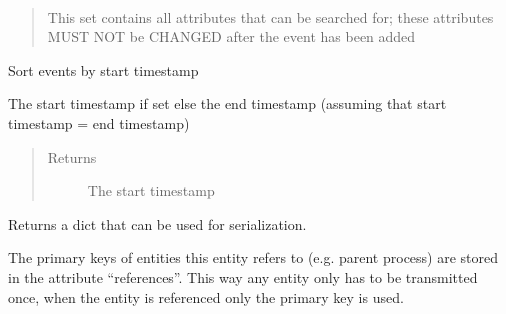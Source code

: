 \documentclass[letterpaper,10pt,english]{sphinxmanual}
\begin{document}
\begin{fulllineitems}
\begin{fulllineitems}
\end{fulllineitems}


\begin{fulllineitems}
\label{ambrosia.model:ambrosia.model.Event.indices}~\begin{quote}

This set contains all attributes that can be searched for; these attributes MUST NOT be CHANGED after the event has
been added
\end{quote}

\end{fulllineitems}


\begin{fulllineitems}
\label{ambrosia.model:ambrosia.model.Event.sort}
Sort events by start timestamp

\end{fulllineitems}


\begin{fulllineitems}
\label{ambrosia.model:ambrosia.model.Event.start_ts}
The start timestamp if set else the end timestamp (assuming that start timestamp = end timestamp)
\begin{quote}\begin{description}
\item[{Returns}] \leavevmode
The start timestamp

\end{description}\end{quote}

\end{fulllineitems}


\begin{fulllineitems}
\label{ambrosia.model:ambrosia.model.Event.to_serializeable}
Returns a dict that can be used for serialization.

The primary keys of entities this entity refers to (e.g. parent process) are stored in the attribute
``references''. This way any entity only has to be transmitted once, when the entity is referenced only the
primary key is used.

\end{fulllineitems}


\end{fulllineitems}
\end{document}
